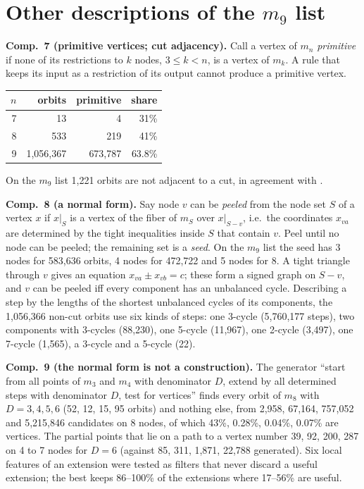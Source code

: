 \documentclass[11pt,a4paper]{article}
\theoremstyle{definition}
\theoremstyle{remark}
\newcommand{\comp}[1]{\medskip\noindent\textbf{#1}}
\begin{document}
\section{Other descriptions of the $m_9$ list}

\comp{Comp.~7 (primitive vertices; cut adjacency).} Call a vertex of $m_n$ \emph{primitive} if none of its restrictions
to $k$ nodes, $3 \le k < n$, is a vertex of $m_k$. A rule that keeps its input as a restriction of its output cannot
produce a primitive vertex.
\begin{center}
\begin{tabular}{rrrr}
\toprule
$n$ & orbits & primitive & share \\
\midrule
7 & 13 & 4 & 31\% \\
8 & 533 & 219 & 41\% \\
9 & 1,056,367 & 673,787 & 63.8\% \\
\bottomrule
\end{tabular}
\end{center}
On the $m_9$ list 1,221 orbits are not adjacent to a cut, in agreement with \cite{DI07}.

\comp{Comp.~8 (a normal form).} Say node $v$ can be \emph{peeled} from the node set $S$ of a vertex $x$ if $x|_S$ is a
vertex of the fiber of $m_S$ over $x|_{S - v}$, i.e.\ the coordinates $x_{va}$ are determined by the tight
inequalities inside $S$ that contain $v$. Peel until no node can be peeled; the remaining set is a \emph{seed}. On
the $m_9$ list the seed has 3 nodes for 583,636 orbits, 4 nodes for 472,722 and 5 nodes for 8. A tight triangle
through $v$ gives an equation $x_{va} \pm x_{vb} = c$; these form a signed graph on $S - v$, and $v$ can be peeled
iff every component has an unbalanced cycle. Describing a step by the lengths of the shortest unbalanced cycles of
its components, the 1,056,366 non-cut orbits use six kinds of steps: one 3-cycle (5,760,177 steps), two components
with 3-cycles (88,230), one 5-cycle (11,967), one 2-cycle (3,497), one 7-cycle (1,565), a 3-cycle and a 5-cycle
(22).

\comp{Comp.~9 (the normal form is not a construction).} The generator ``start from all points of $m_3$ and $m_4$ with
denominator $D$, extend by all determined steps with denominator $D$, test for vertices'' finds every orbit of
$m_8$ with $D = 3, 4, 5, 6$ (52, 12, 15, 95 orbits) and nothing else, from 2,958, 67,164, 757,052 and 5,215,846
candidates on 8 nodes, of which 43\%, 0.28\%, 0.04\%, 0.07\% are vertices. The partial points that lie on a path to
a vertex number 39, 92, 200, 287 on 4 to 7 nodes for $D = 6$ (against 85, 311, 1,871, 22,788 generated). Six local
features of an extension were tested as filters that never discard a useful extension; the best keeps 86--100\% of
the extensions where 17--56\% are useful.
\end{document}

